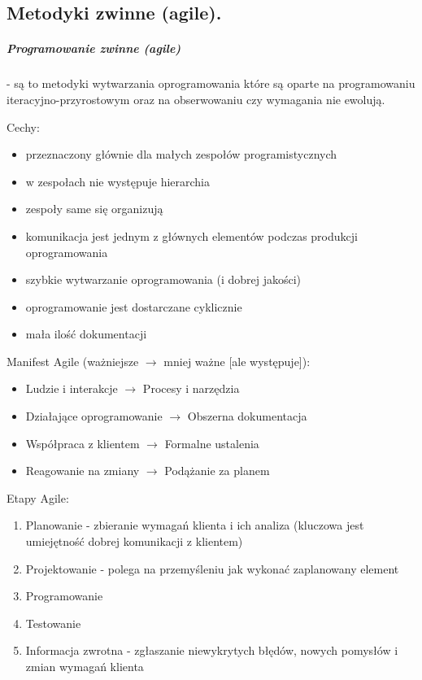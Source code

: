 \documentclass[a4paper,12pt,oneside]{book}
\begin{document}
			\newpage\subsection{Metodyki zwinne (agile).}
				\subparagraph{Programowanie zwinne (agile)} - są to metodyki wytwarzania oprogramowania które są
				oparte na programowaniu iteracyjno-przyrostowym oraz na obserwowaniu czy wymagania
				nie ewolują.
				
				Cechy:
				\begin{itemize}
					\item przeznaczony głównie dla małych zespołów programistycznych
					\item w zespołach nie występuje hierarchia
					\item zespoły same się organizują
					\item komunikacja jest jednym z głównych elementów podczas produkcji oprogramowania
					\item szybkie wytwarzanie oprogramowania (i dobrej jakości)
					\item oprogramowanie jest dostarczane cyklicznie
					\item mała ilość dokumentacji
				\end{itemize}
			
				Manifest Agile (ważniejsze \(\rightarrow\) mniej ważne [ale występuje]):
				\begin{itemize}
					\item Ludzie i interakcje \(\rightarrow\) Procesy i narzędzia
					\item Działające oprogramowanie \(\rightarrow\) Obszerna dokumentacja
					\item Współpraca z klientem \(\rightarrow\) Formalne ustalenia
					\item Reagowanie na zmiany \(\rightarrow\) Podążanie za planem
				\end{itemize}
		
				Etapy Agile:
				\begin{enumerate}
					\item Planowanie - zbieranie wymagań klienta i ich analiza (kluczowa jest umiejętność
					dobrej komunikacji z klientem)
					\item Projektowanie - polega na przemyśleniu jak wykonać zaplanowany element
					\item Programowanie
					\item Testowanie
					\item Informacja zwrotna - zgłaszanie niewykrytych błędów, nowych pomysłów i zmian
					wymagań klienta
				\end{enumerate}
			
\end{document}
